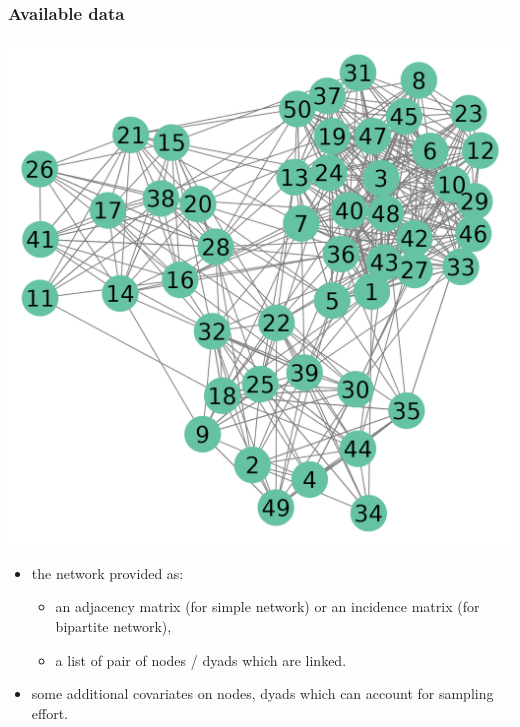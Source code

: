 \documentclass[compress,10pt]{beamer}
\begin{document}
\begin{frame} \frametitle{Available data}
 
\begin{center}
 \includegraphics[scale=.45]{plots/network_raw.png}
\end{center}

\begin{itemize}
 \item  the network provided as:
\begin{itemize}
 \item an adjacency matrix (for simple network) or an incidence matrix (for bipartite network),
 \item a list of pair of nodes / dyads which are linked.
\end{itemize}

\item some additional covariates on nodes, dyads which can account for sampling effort.
 \end{itemize}
\end{frame}
\end{document}
